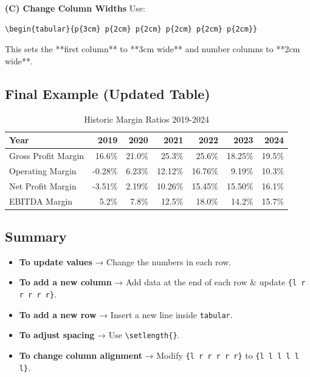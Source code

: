 \documentclass[a4paper,num-refs]{oup-contemporary}
\begin{document}
\textbf{(C) Change Column Widths}  
Use:
\begin{verbatim}
\begin{tabular}{p{3cm} p{2cm} p{2cm} p{2cm} p{2cm} p{2cm}}
\end{verbatim}
This sets the **first column** to **3cm wide** and number columns to **2cm wide**.

\subsection{Final Example (Updated Table)}

\begin{table}[b!]
\caption{Historic Margin Ratios 2019-2024}\label{tab:example}
\setlength\tabcolsep{6pt}  %
\begin{tabular}{l r r r r r r}  %
\toprule
Year & 2019 & 2020 & 2021 & 2022 & 2023 & 2024 \\
\midrule
Gross Profit Margin & 16.6\% & 21.0\% & 25.3\% & 25.6\% & 18.25\% & 19.5\% \\
Operating Margin & -0.28\% & 6.23\% & 12.12\% & 16.76\% & 9.19\% & 10.3\% \\
Net Profit Margin & -3.51\% & 2.19\% & 10.26\% & 15.45\% & 15.50\% & 16.1\% \\
EBITDA Margin & 5.2\% & 7.8\% & 12.5\% & 18.0\% & 14.2\% & 15.7\% \\
\bottomrule
\end{tabular}
\end{table}

\subsection{Summary}
\begin{itemize}
    \item \textbf{To update values} → Change the numbers in each row.
    \item \textbf{To add a new column} → Add data at the end of each row & update \texttt{\{l r r r r r\}}.
    \item \textbf{To add a new row} → Insert a new line inside \texttt{tabular}.
    \item \textbf{To adjust spacing} → Use \texttt{\textbackslash setlength\tabcolsep\{\}}.
    \item \textbf{To change column alignment} → Modify \texttt{\{l r r r r r\}} to \texttt{\{l l l l l l\}}.
\end{itemize}
\end{document}
